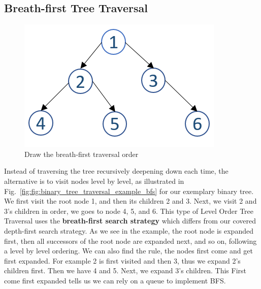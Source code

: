 \documentclass[main.tex]{subfiles}
\begin{document}
\subsection{Breath-first Tree Traversal}
\label{bfs_tree_traversal}
\begin{figure}[H]
    \centering
    \includegraphics[width = .45\columnwidth]{fig/binary_tree_example.png}
    \caption{Draw the breath-first traversal order }
    \label{fig:binary_tree_traversal_example_bfs}
\end{figure}
Instead of traversing the tree recursively deepening down each time, the alternative is to visit  nodes level by level, as illustrated in Fig.~\ref{fig:fig:binary_tree_traversal_example_bfs} for our exemplary binary tree. We first visit the root node 1, and then its children 2 and 3. Next, we visit 2 and 3's children in order, we goes to node 4, 5, and 6.  This type of Level Order Tree Traversal uses the \textbf{breath-first search strategy} which differs from our covered depth-first search strategy. As we see in the example, the root node is expanded first, then all successors of the root node are expanded next, and so on, following a level by level ordering. We can also find the rule, the nodes first come and get first expanded. For example 2 is first visited and then 3, thus we expand 2's children first. Then we have 4 and 5. Next, we expand 3's children. This First come first expanded tells us we can rely on a queue to implement BFS. 
\end{document}
